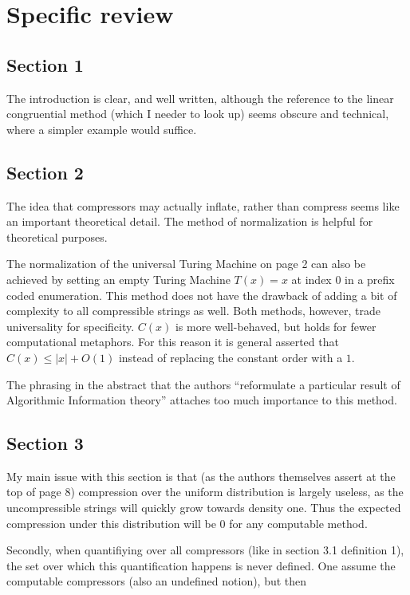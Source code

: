 \documentclass{article}
\theoremstyle{definition}
\begin{document}
\section{Specific review}
\subsection*{Section 1}

The introduction is clear, and well written, although the reference to the linear congruential method (which I needer to look up) seems obscure and technical, where a simpler example would suffice.

\subsection*{Section 2}

The idea that compressors may actually inflate, rather than compress seems like an important theoretical detail. The method of normalization is helpful for theoretical purposes.

The normalization of the universal Turing Machine on page 2 can also be achieved by setting an empty Turing Machine $T(x) = x$ at index 0 in a prefix coded enumeration. This method does not have the drawback of adding a bit of complexity to all compressible strings as well. Both methods, however, trade universality for specificity. $C(x)$ is more well-behaved, but holds for fewer computational metaphors. For this reason it is general asserted that $C(x) \leq |x| + O(1)$ instead of replacing the constant order with a $1$. 

The phrasing in the abstract that the authors ``reformulate a particular result of Algorithmic Information theory'' attaches too much importance to this method.

\subsection*{Section 3}
My main issue with this section is that (as the authors themselves assert at the top of page 8) compression over the uniform distribution is largely useless, as the uncompressible strings will quickly grow towards density one. Thus the expected compression under this distribution will be 0 for any computable method.

Secondly, when quantifiying over all compressors (like in section 3.1 definition 1), the set over which this quantification happens is never defined.  One assume the computable compressors (also an undefined notion), but then 
\end{document}
